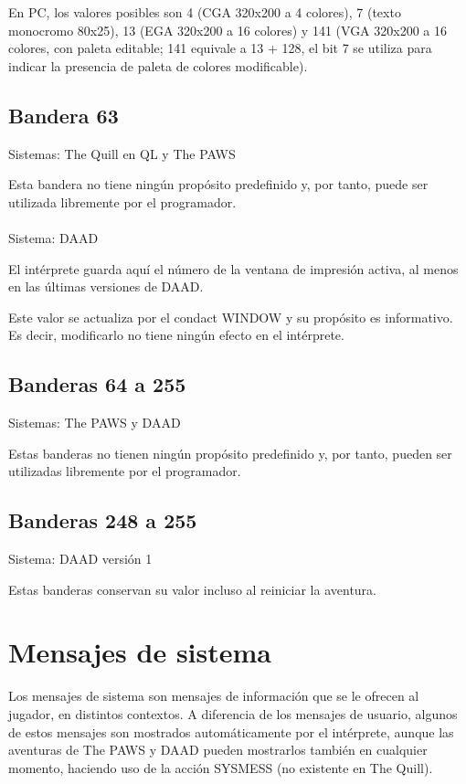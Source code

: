 \documentclass[11pt, a5paper]{article}
\newcommand{\quill}{\textsf{The Quill}\xspace}
\newcommand{\paw}{\textsf{The PAWS}\xspace}
\newcommand{\daad}{\textsf{DAAD}\xspace}
\newcommand{\sistema}[1]{\noindent Sistema: #1 \nopagebreak}
\newcommand{\sistemas}[1]{\noindent Sistemas: #1 \nopagebreak}
\begin{document}
En PC, los valores posibles son 4 (CGA 320x200 a 4 colores), 7 (texto monocromo 80x25), 13 (EGA 320x200 a 16 colores) y 141 (VGA 320x200 a 16 colores, con paleta editable; 141 equivale a 13 + 128, el bit 7 se utiliza para indicar la presencia de paleta de colores modificable).

\subsection{Bandera 63}

\sistemas{\quill en QL y \paw}

Esta bandera no tiene ningún propósito predefinido y, por tanto, puede ser utilizada libremente por el programador.
\\\ \\
\sistema{\daad}

El intérprete guarda aquí el número de la ventana de impresión activa, al menos en las últimas versiones de \daad. \cite[pág. 62]{DAAD}

Este valor se actualiza por el condact WINDOW y su propósito es informativo. Es decir, modificarlo no tiene ningún efecto en el intérprete.

\subsection{Banderas 64 a 255}

\sistemas{\paw y \daad}

Estas banderas no tienen ningún propósito predefinido y, por tanto, pueden ser utilizadas libremente por el programador.

\subsection{Banderas 248 a 255}

\sistema{\daad versión 1}

Estas banderas conservan su valor incluso al reiniciar la aventura.


\section{Mensajes de sistema}

Los mensajes de sistema son mensajes de información que se le ofrecen al jugador, en distintos contextos. A diferencia de los mensajes de usuario, algunos de estos mensajes son mostrados automáticamente por el intérprete, aunque las aventuras de \paw y \daad pueden mostrarlos también en cualquier momento, haciendo uso de la acción SYSMESS (no existente en \quill).
\end{document}
